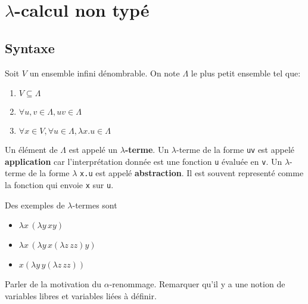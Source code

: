 \chapter{$\lambda$-calcul non typé}

\section{Syntaxe}

\begin{definition} 
  Soit $V$ un ensemble infini dénombrable. On note $\Lambda$ le plus petit
  ensemble tel que:
  \begin{enumerate}
    \item $V \subseteq \Lambda$
    \item $\forall u, v \in \Lambda, uv \in \Lambda$
    \item $\forall x \in V, \forall u \in \Lambda, \lambda x.u \in \Lambda$
  \end{enumerate}

  Un élément de $\Lambda$ est appelé un \textbf{$\lambda$-terme}.
  Un $\lambda$-terme de la forme \verb|uv| est appelé \textbf{application} car
  l'interprétation donnée est une fonction \verb|u| évaluée en \verb|v|.
  Un $\lambda$-terme de la forme $\lambda$ \verb|x.u| est appelé
\textbf{abstraction}. Il est souvent representé comme la fonction qui envoie
\verb|x| sur \verb|u|.

\end{definition}

Des exemples de $\lambda$-termes sont
\begin{itemize}
  \item $\lambda x \, (\lambda y \, x y)$
  \item $\lambda x \, (\lambda y \, x (\lambda z \, z z) y)$
  \item $x (\lambda y \, y (\lambda z \, z z))$
\end{itemize}

Parler de la motivation du $\alpha$-renommage. Remarquer qu'il y a une notion de
variables libres et variables liées à définir.

\begin{definition} 

\end{definition}

